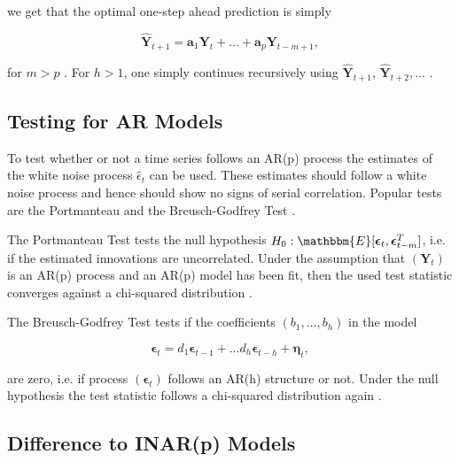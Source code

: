 we get that the optimal one-step ahead prediction is simply 

\begin{equation}
\hat{\bm{Y}}_{t+1} = \bm{a}_1\bm{Y}_{t} + \ldots + \bm{a}_p\bm{Y}_{t-m+1},
\label{eq:AR 1step Forecasting}
\end{equation}

for $m>p$ \cite{Scherrer:2021}. For $h>1$, one simply continues recursively using $\hat{\bm{Y}}_{t+1}$, $\hat{\bm{Y}}_{t+2},\ldots$ .

\subsection{Testing for AR Models}
\label{sec: Testing for ar models}

To test whether or not a time series follows an AR(p) process the estimates of the white noise process $\hat{\epsilon}_t$ can be used. These estimates should follow a white noise process and hence should show no signs of serial correlation. Popular tests are the Portmanteau and the Breusch-Godfrey Test \cite{Scherrer:2021}. 

The Portmanteau Test tests the null hypothesis $H_0: \mathbbm{E}[\bm{\epsilon}_t,\bm{\epsilon}_{t-m}^T]$, i.e. if the estimated innovations are uncorrelated. Under the assumption that $(\bm{Y}_t)$ is an AR(p) process and an AR(p) model has been fit, then the used test statistic converges against a chi-squared distribution \cite{Scherrer:2021}. 

The Breusch-Godfrey Test tests if the coefficients $(b_1,\ldots,b_h)$ in the model 

\begin{equation}
\bm{\epsilon}_t = d_1\bm{\epsilon}_{t-1} +\ldots d_h \bm{\epsilon}_{t-h} + \bm{\eta}_t,
\label{eq:Breusch-Godfrey Test model}
\end{equation}

are zero, i.e. if process $(\bm{\epsilon}_t)$ follows an AR(h) structure or not. Under the null hypothesis the test statistic follows a chi-squared distribution again \cite{Scherrer:2021}. 


\subsection{Difference to INAR(p) Models}
\label{sec: Difference to Inar models}


